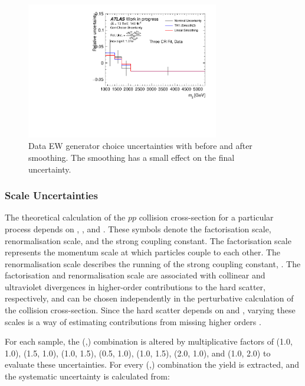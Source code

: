 \begin{figure}[t]
  \centering
  \includegraphics[width=0.75\textwidth]{plots/diffx/genchoice/data/sys_errors_mjj_generator_choice_ew_3cr.pdf}
  \caption{Data EW generator choice uncertainties with \mjj before and after smoothing. The smoothing has a small effect on the final uncertainty.\label{fig:vbswy:genchoiceewdata}}
\end{figure}

\subsubsection{Scale Uncertainties}

The theoretical calculation of the $pp$ collision cross-section for a particular process depends on \muf, \mur, and \alphas. These symbols denote the factorisation scale, renormalisation scale, and the strong coupling constant. The factorisation scale represents the momentum scale at which particles couple to each other. The renormalisation scale describes the running of the strong coupling constant, \alphas. The factorisation and renormalisation scale are associated with collinear and ultraviolet divergences in higher-order contributions to the hard scatter, respectively, and can be chosen independently in the perturbative calculation of the collision cross-section. Since the hard scatter depends on \muf and \mur, varying these scales is a way of estimating contributions from missing higher orders \cite{VBSWy:Behnke}. 

For each sample, the (\muf,\mur) combination is altered by multiplicative factors of (1.0, 1.0), (1.5, 1.0), (1.0, 1.5), (0.5, 1.0), (1.0, 1.5), (2.0, 1.0), and (1.0, 2.0) to evaluate these uncertainties. For every (\muf,\mur) combination the \ewwy yield is extracted, and the systematic uncertainty is calculated from:

